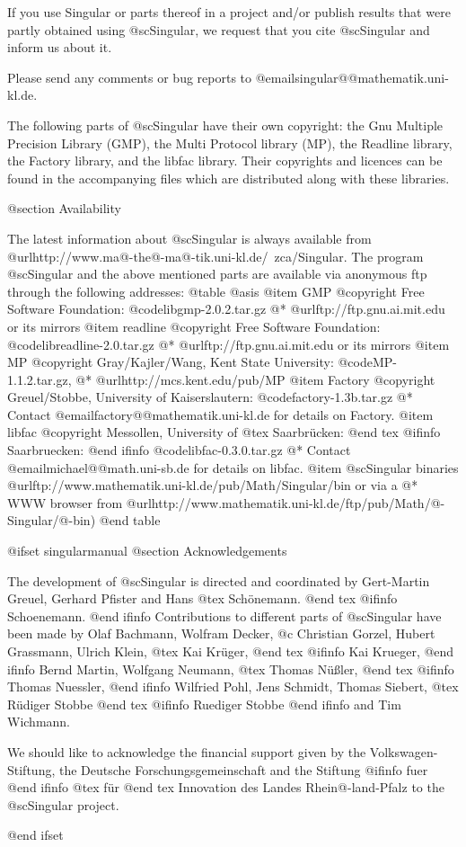 If you use Singular or parts thereof in a project and/or publish
results that were partly obtained using @sc{Singular}, we request that you
cite @sc{Singular} and inform us about it.

Please send any comments or bug reports to
@email{singular@@mathematik.uni-kl.de}.

The following parts of @sc{Singular} have their own copyright: the Gnu Multiple
Precision Library (GMP), the Multi Protocol library (MP), the Readline library,
the Factory library, and the libfac library.
Their copyrights and licences can be found in the accompanying files
which are distributed along with these libraries.

@section Availability

The latest information about @sc{Singular} is always available from
@url{http://www.ma@-the@-ma@-tik.uni-kl.de/~zca/Singular}.
The program @sc{Singular} and the above mentioned parts are available via
anonymous ftp through the following addresses:
@table @asis
@item GMP
@copyright{} Free Software Foundation:
@code{libgmp-2.0.2.tar.gz}
@* @url{ftp://ftp.gnu.ai.mit.edu} or its mirrors
@item readline
@copyright{} Free Software Foundation:
@code{libreadline-2.0.tar.gz}
@* @url{ftp://ftp.gnu.ai.mit.edu} or its mirrors
@item MP
@copyright{} Gray/Kajler/Wang, Kent State University:
@code{MP-1.1.2.tar.gz},
@* @url{http://mcs.kent.edu/pub/MP}
@item Factory
@copyright{} Greuel/Stobbe, University of Kaiserslautern:
@code{factory-1.3b.tar.gz}
@* Contact @email{factory@@mathematik.uni-kl.de} for details on Factory.
@item libfac
@copyright{}  Messollen, University of 
@tex
Saarbr\"ucken:
@end tex
@ifinfo
Saarbruecken:
@end ifinfo
@code{libfac-0.3.0.tar.gz}
@* Contact @email{michael@@math.uni-sb.de} for details on libfac.
@item @sc{Singular} binaries
@url{ftp://www.mathematik.uni-kl.de/pub/Math/Singular/bin} or via a
@* WWW browser from
@url{http://www.mathematik.uni-kl.de/ftp/pub/Math/@-Singular/@-bin})
@end table

@ifset singularmanual
@section Acknowledgements

The development of @sc{Singular} is directed and coordinated by
Gert-Martin Greuel, Gerhard Pfister and Hans
@tex
Sch\"onemann.
@end tex
@ifinfo
Schoenemann.
@end ifinfo
Contributions to different parts of @sc{Singular} have been made by
Olaf Bachmann,
Wolfram Decker,
@c Christian Gorzel,
Hubert Grassmann,
Ulrich Klein,
@tex
Kai Kr\"uger,
@end tex
@ifinfo
Kai Krueger,
@end ifinfo
Bernd Martin,
Wolfgang Neumann,
@tex
Thomas N\"u{\ss}ler,
@end tex
@ifinfo
Thomas Nuessler,
@end ifinfo
Wilfried Pohl,
Jens Schmidt,
Thomas Siebert,
@tex
R\"udiger Stobbe
@end tex
@ifinfo
Ruediger Stobbe
@end ifinfo
and
Tim Wichmann.

We should like to acknowledge the financial support given by
the Volkswagen-Stiftung,
the Deutsche Forschungsgemeinschaft
and the Stiftung
@ifinfo
fuer
@end ifinfo
@tex
f\"ur
@end tex
Innovation des Landes Rhein@-land-Pfalz
to the
@sc{Singular} project.

@end ifset
